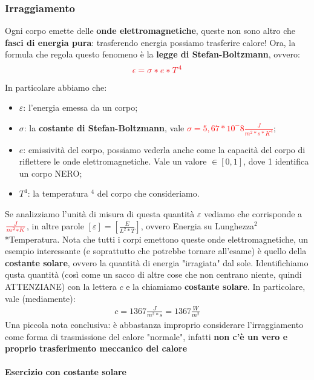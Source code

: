         \subsubsection{Irraggiamento}
            Ogni corpo emette delle \textbf{onde elettromagnetiche}, queste non sono altro che \textbf{fasci di energia pura}: trasferendo energia possiamo trasferire calore! Ora, la formula che regola questo fenomeno è la \textbf{legge di Stefan-Boltzmann}, ovvero:
            \begin{align*}
                \textcolor{Red}{\epsilon=\sigma*e*T^4}
            \end{align*}
            In particolare abbiamo che:
            \begin{itemize}
                \item $\varepsilon$: l'energia emessa da un corpo;
                \item $\sigma$: la \textbf{costante di Stefan-Boltzmann}, vale \textcolor{Red}{$\sigma=5,67*10^-8\frac{J}{m^2*s*K^4}$};
                \item $e$: emissività del corpo, possiamo vederla anche come la capacità del corpo di riflettere le onde elettromagnetiche. Vale un valore $\in [0, 1]$, dove 1 identifica un corpo NERO;
                \item $T^4$: la temperatura $^4$ del corpo che consideriamo.
            \end{itemize}
            Se analizziamo l'unità di misura di questa quantità $\varepsilon$ vediamo che corrisponde a $\textcolor{Red}{\frac{J}{m^2*K}}$, in altre parole $[\varepsilon]=[\frac{E}{L^2*T}]$, ovvero Energia su Lunghezza$^2$*Temperatura.
            Nota che tutti i corpi emettono queste onde elettromagnetiche, un esempio interessante (e soprattutto che potrebbe tornare all'esame) è quello della \textbf{costante solare}, ovvero la quantità di energia "irragiata" dal sole. Identifichiamo qusta quantità (così come un sacco di altre cose che non centrano niente, quindi ATTENZIANE) con la lettera $c$ e la chiamiamo \textbf{costante solare}. In particolare, vale (mediamente):
            \begin{align*}
                c=1367\frac{J}{m^2*s}=1367\frac{W}{m^2}
            \end{align*}
            Una piccola nota conclusiva: è abbastanza improprio considerare l'irraggiamento come forma di trasmissione del calore "normale", infatti \textbf{non c'è un vero e proprio trasferimento meccanico del calore}

            \paragraph{Esercizio con costante solare}

